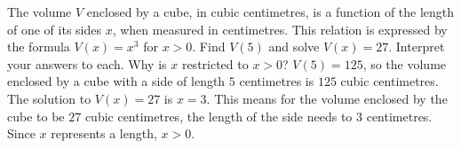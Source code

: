 {The volume $V$ enclosed by a cube, in cubic centimetres, is a function of the length of one of its sides $x$, when measured in centimetres.  This relation is expressed by the formula $V(x) = x^3$ for $x > 0$.  Find $V(5)$ and solve $V(x) = 27$.  Interpret your answers to each.  Why is $x$ restricted to $x > 0$?}
{$V(5) = 125$, so the volume enclosed by a cube with a side of length $5$ centimetres is $125$ cubic centimetres.  The solution to $V(x) = 27$ is $x = 3$.  This means for the volume enclosed by the cube to be $27$ cubic centimetres, the length of the side needs to $3$ centimetres.  Since $x$ represents a length, $x > 0$.}